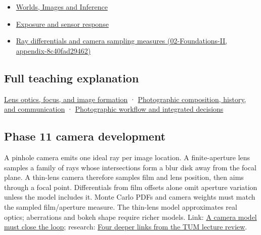 \begin{itemize}
\item
  \href{Continuous\%20Notes/University\%20-\%20Worlds,\%20Images\%20and\%20Inference\%20-\%20Graphics,\%20Vision\%20and\%20Photography}{Worlds, Images and Inference}
\item
  \hyperref[appendix-92d45cdf2afc]{Exposure and sensor response}
\item
  \href{}{Ray differentials and camera sampling measures (02-Foundations-II, appendix-8c40fad29462)}
\end{itemize}

\subsection{Full teaching explanation}\label{full-teaching-explanation}

\href{Continuous\%20Notes/University\%20-\%20Worlds,\%20Images\%20and\%20Inference\%20-\%20Graphics,\%20Vision\%20and\%20Photography\#Lens\%20optics,\%20focus,\%20and\%20image\%20formation}{Lens optics, focus, and image formation} · \href{Continuous\%20Notes/University\%20-\%20Worlds,\%20Images\%20and\%20Inference\%20-\%20Graphics,\%20Vision\%20and\%20Photography\#Photographic\%20composition,\%20history,\%20and\%20communication}{Photographic composition, history, and communication} · \href{Continuous\%20Notes/University\%20-\%20Worlds,\%20Images\%20and\%20Inference\%20-\%20Graphics,\%20Vision\%20and\%20Photography\#Photographic\%20workflow\%20and\%20integrated\%20decisions}{Photographic workflow and integrated decisions}

\subsection{Phase 11 camera development}\label{phase-11-camera-development}

A pinhole camera emits one ideal ray per image location. A finite-aperture lens samples a family of rays whose intersections form a blur disk away from the focal plane. A thin-lens camera therefore samples film and lens position, then aims through a focal point. Differentials from film offsets alone omit aperture variation unless the model includes it. Monte Carlo PDFs and camera weights must match the sampled film/aperture measure. The thin-lens model approximates real optics; aberrations and bokeh shape require richer models. Link: \href{Continuous\%20Notes/Computing\%20Foundations\%20-\%20From\%20Bits\%20to\%20C++\%20and\%20Systems\%20APIs\#A\%20camera\%20model\%20must\%20close\%20the\%20loop}{A camera model must close the loop}; research: \href{Continuous\%20Notes/Computing\%20Foundations\%20-\%20From\%20Bits\%20to\%20C++\%20and\%20Systems\%20APIs\#Four\%20deeper\%20links\%20from\%20the\%20TUM\%20lecture\%20review}{Four deeper links from the TUM lecture review}.
